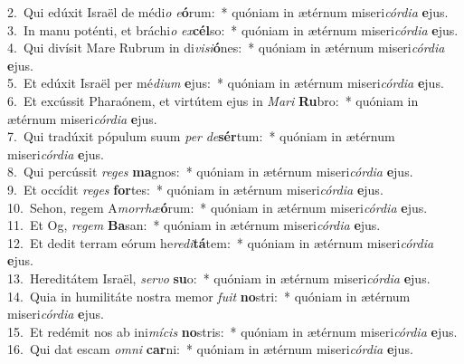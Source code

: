 {2.~}Qui edúxit Israël de médi\textit{o} \textit{e}\textbf{ó}rum:~* quóniam in ætérnum miseri\textit{cór}\textit{di}\textit{a} \textbf{e}jus.\\
{3.~}In manu poténti, et bráchi\textit{o} \textit{ex}\textbf{cél}so:~* quóniam in ætérnum miseri\textit{cór}\textit{di}\textit{a} \textbf{e}jus.\\
{4.~}Qui divísit Mare Rubrum in di\textit{vi}\textit{si}\textbf{ó}nes:~* quóniam in ætérnum miseri\textit{cór}\textit{di}\textit{a} \textbf{e}jus.\\
{5.~}Et edúxit Israël per mé\textit{di}\textit{um} \textbf{e}jus:~* quóniam in ætérnum miseri\textit{cór}\textit{di}\textit{a} \textbf{e}jus.\\
{6.~}Et excússit Pharaónem, et virtútem ejus in \textit{Ma}\textit{ri} \textbf{Ru}bro:~* quóniam in ætérnum miseri\textit{cór}\textit{di}\textit{a} \textbf{e}jus.\\
{7.~}Qui tradúxit pópulum suum \textit{per} \textit{de}\textbf{sér}tum:~* quóniam in ætérnum miseri\textit{cór}\textit{di}\textit{a} \textbf{e}jus.\\
{8.~}Qui percússit \textit{re}\textit{ges} \textbf{ma}gnos:~* quóniam in ætérnum miseri\textit{cór}\textit{di}\textit{a} \textbf{e}jus.\\
{9.~}Et occídit \textit{re}\textit{ges} \textbf{for}tes:~* quóniam in ætérnum miseri\textit{cór}\textit{di}\textit{a} \textbf{e}jus.\\
{10.~}Sehon, regem A\textit{mor}\textit{rhæ}\textbf{ó}rum:~* quóniam in ætérnum miseri\textit{cór}\textit{di}\textit{a} \textbf{e}jus.\\
{11.~}Et Og, \textit{re}\textit{gem} \textbf{Ba}san:~* quóniam in ætérnum miseri\textit{cór}\textit{di}\textit{a} \textbf{e}jus.\\
{12.~}Et dedit terram eórum he\textit{re}\textit{di}\textbf{tá}tem:~* quóniam in ætérnum miseri\textit{cór}\textit{di}\textit{a} \textbf{e}jus.\\
{13.~}Hereditátem Israël, \textit{ser}\textit{vo} \textbf{su}o:~* quóniam in ætérnum miseri\textit{cór}\textit{di}\textit{a} \textbf{e}jus.\\
{14.~}Quia in humilitáte nostra memor \textit{fu}\textit{it} \textbf{no}stri:~* quóniam in ætérnum miseri\textit{cór}\textit{di}\textit{a} \textbf{e}jus.\\
{15.~}Et redémit nos ab ini\textit{mí}\textit{cis} \textbf{no}stris:~* quóniam in ætérnum miseri\textit{cór}\textit{di}\textit{a} \textbf{e}jus.\\
{16.~}Qui dat escam \textit{om}\textit{ni} \textbf{car}ni:~* quóniam in ætérnum miseri\textit{cór}\textit{di}\textit{a} \textbf{e}jus.\\
